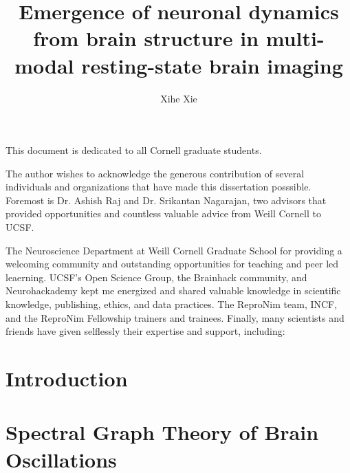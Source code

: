 \documentclass[phd,tocprelim]{cornell}
\title {Emergence of neuronal dynamics from brain structure in multi-modal resting-state brain imaging}
\author {Xihe Xie}
\begin{document}
\maketitle
\makecopyright

\begin{abstract}

\end{abstract}


\begin{dedication}
This document is dedicated to all Cornell graduate students.
\end{dedication}

\begin{acknowledgements}
The author wishes to acknowledge the generous contribution of several individuals and organizations that have made this dissertation posssible. Foremost is Dr. Ashish Raj and Dr. Srikantan Nagarajan, two advisors that provided opportunities and countless valuable advice from Weill Cornell to UCSF. 

The Neuroscience Department at Weill Cornell Graduate School for providing a welcoming community and outstanding opportunities for teaching and peer led leaerning. UCSF's Open Science Group, the Brainhack community, and Neurohackademy kept me energized and shared valuable knowledge in scientific knowledge, publishing, ethics, and data practices. The ReproNim team, INCF, and the ReproNim Fellowship trainers and trainees. Finally, many scientists and friends have given selflessly their expertise and support, including: 
\end{acknowledgements}

\contentspage
\tablelistpage
\figurelistpage

\normalspacing \setcounter{page}{1} 
\pagestyle{cornell} \addtolength{\parskip}{0.5\baselineskip}

\chapter{Introduction}



\chapter{Spectral Graph Theory of Brain Oscillations}

\end{document}
